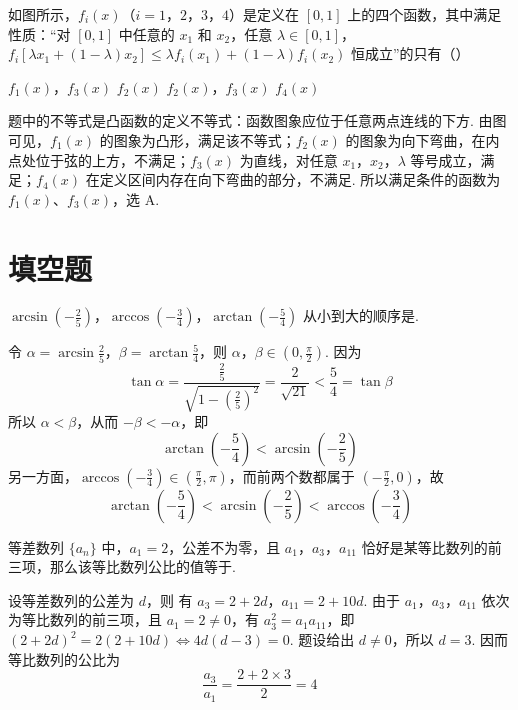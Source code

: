 \begin{problem}
如图所示，\(f_i(x)\)（\(i=1\)，\(2\)，\(3\)，\(4\)）是定义在 \([0,1]\) 上的四个函数，其中满足性质：“对 \([0,1]\) 中任意的 \(x_1\) 和 \(x_2\)，任意 \(\lambda\in[0,1]\)，\(f_i[\lambda x_1+(1-\lambda)x_2]\le \lambda f_i(x_1)+(1-\lambda)f_i(x_2)\) 恒成立”的只有（\quad）


\choices
    {\(f_1(x)\)，\(f_3(x)\)}
    {\(f_2(x)\)}
    {\(f_2(x)\)，\(f_3(x)\)}
    {\(f_4(x)\)}

\begin{solution}
题中的不等式是凸函数的定义不等式：函数图象应位于任意两点连线的下方. 由图可见，\(f_{1}(x)\) 的图象为凸形，满足该不等式；\(f_{2}(x)\) 的图象为向下弯曲，在内点处位于弦的上方，不满足；\(f_{3}(x)\) 为直线，对任意 \(x_{1}\)，\(x_{2}\)，\(\lambda\) 等号成立，满足；\(f_{4}(x)\) 在定义区间内存在向下弯曲的部分，不满足. 所以满足条件的函数为 \(f_{1}(x)\)、\(f_{3}(x)\)，选 A.
\end{solution}
\end{problem}

\section{填空题}
\begin{problem}
\(\arcsin\left(-\frac{2}{5}\right)\)，\(\arccos\left(-\frac{3}{4}\right)\)，\(\arctan\left(-\frac{5}{4}\right)\) 从小到大的顺序是\fillinblank{}.

\begin{solution}
令 \(\alpha=\arcsin\frac25\)，\(\beta=\arctan\frac54\)，则 \(\alpha\)，\(\beta\in\left(0,\frac\pi2\right)\). 因为
\[
\tan\alpha=\frac{\frac{2}{5}}{\sqrt{1-(\frac{2}{5})^{2}}}=\frac{2}{\sqrt{21}}<\frac54=\tan\beta
\]
所以 \(\alpha<\beta\)，从而 \(-\beta<-\alpha\)，即
\[
\arctan\left(-\frac54\right)<\arcsin\left(-\frac25\right)
\]
另一方面，\(\arccos(-\frac{3}{4})\in(\frac\pi2,\pi)\)，而前两个数都属于 \((-\frac\pi2,0)\)，故
\[
\arctan\left(-\frac54\right)<\arcsin\left(-\frac25\right)<\arccos\left(-\frac34\right)
\]
\end{solution}
\end{problem}

\begin{problem}
等差数列 \(\{a_n\}\) 中，\(a_1=2\)，公差不为零，且 \(a_1\)，\(a_3\)，\(a_{11}\) 恰好是某等比数列的前三项，那么该等比数列公比的值等于\fillinblank{}.

\begin{solution}
设等差数列的公差为 \(d\)，则
有 \(a_{3}=2+2d\)，\(a_{11}=2+10d\).
由于 \(a_{1}\)，\(a_{3}\)，\(a_{11}\) 依次为等比数列的前三项，且 \(a_{1}=2\ne0\)，有 \(a_{3}^{2}=a_{1}a_{11}\)，即 \((2+2d)^{2}=2(2+10d)\Longleftrightarrow 4d(d-3)=0\).
题设给出 \(d\ne0\)，所以 \(d=3\). 因而等比数列的公比为
\[
\frac{a_{3}}{a_{1}}=\frac{2+2\times3}{2}=4
\]
\end{solution}
\end{problem}

